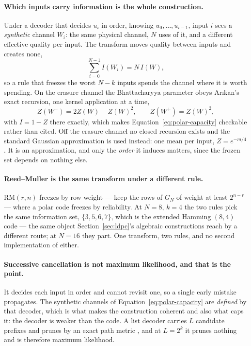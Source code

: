 \documentclass[11pt,a4paper]{article}
\begin{document}
\paragraph{Which inputs carry information is the whole construction.}
Under a decoder that decides $u_i$ in order, knowing $u_0, \dots, u_{i-1}$,
input $i$ sees a \emph{synthetic} channel $W_i$: the same physical channel,
$N$ uses of it, and a different effective quality per input. The transform
moves quality between inputs and creates none,
\begin{equation}
  \sum_{i=0}^{N-1} I(W_i) = N \, I(W),
  \label{eq:polar-capacity}
\end{equation}
so a rule that freezes the worst $N - k$ inputs spends the channel where it is
worth spending. On the erasure channel the Bhattacharyya parameter obeys
Ar\i kan's exact recursion, one kernel application at a time,
\begin{equation}
  Z(W^{-}) = 2 Z(W) - Z(W)^{2}, \qquad Z(W^{+}) = Z(W)^{2},
  \label{eq:polar-bec}
\end{equation}
with $I = 1 - Z$ there exactly, which makes Equation~\ref{eq:polar-capacity}
checkable rather than cited. Off the erasure channel no closed recursion
exists and the standard Gaussian approximation is used instead: one mean per
input, $Z = e^{-m/4}$. It is an approximation, and only the \emph{order} it
induces matters, since the frozen set depends on nothing else.

\paragraph{Reed--Muller is the same transform under a different rule.}
$\mathrm{RM}(r, n)$ freezes by row weight --- keep the rows of $G_N$ of weight
at least $2^{n-r}$ --- where a polar code freezes by reliability. At
$N = 8$, $k = 4$ the two rules pick the same information set, $\{3,5,6,7\}$,
which is the extended Hamming $(8,4)$ code ---
the same object Section~\ref{sec:ldpc}'s algebraic constructions reach by a
different route; at $N = 16$ they part. One transform, two
rules, and no second implementation of either.

\paragraph{Successive cancellation is not maximum likelihood, and that is the
point.} It decides each input in order and cannot revisit one, so a single
early mistake propagates. The synthetic channels of
Equation~\ref{eq:polar-capacity} are \emph{defined} by that decoder, which is
what makes the construction coherent and also what caps it: the decoder is
weaker than the code. A list decoder carries $L$ candidate prefixes and prunes
by an exact path metric \citep{talvardy2015}, and at $L = 2^{k}$ it prunes
nothing and is therefore maximum likelihood.
\end{document}
